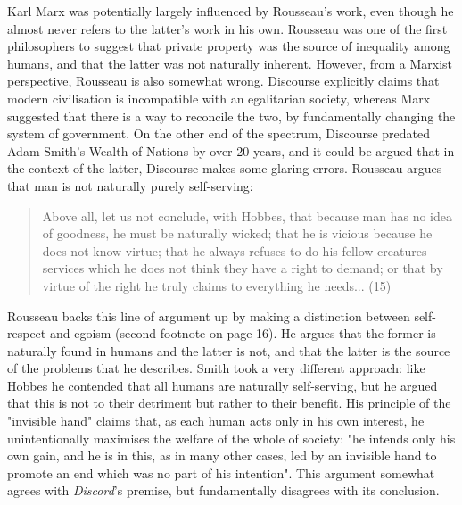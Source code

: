 Karl Marx was potentially largely influenced by Rousseau's work, even though he almost never refers to the latter's work in his own. Rousseau was one of the first philosophers to suggest that private property was the source of inequality among humans, and that the latter was not naturally inherent. However, from a Marxist perspective, Rousseau is also somewhat wrong. Discourse explicitly claims that modern civilisation is incompatible with an egalitarian society, whereas Marx suggested that there is a way to reconcile the two, by fundamentally changing the system of government. On the other end of the spectrum, Discourse predated Adam Smith's Wealth of Nations by over 20 years, and it could be argued that in the context of the latter, Discourse makes some glaring errors. Rousseau argues that man is not naturally purely self-serving:

\begin{quote}
  Above all, let us not conclude, with Hobbes, that because man has no idea of goodness, he must be naturally wicked; that he is vicious because he does not know virtue; that he always refuses to do his fellow-creatures services which he does not think they have a right to demand; or that by virtue of the right he truly claims to everything he needs... (15)
\end{quote}

Rousseau backs this line of argument up by making a distinction between self-respect and egoism (second footnote on page 16). He argues that the former is naturally found in humans and the latter is not, and that the latter is the source of the problems that he describes. Smith took a very different approach: like Hobbes he contended that all humans are naturally self-serving, but he argued that this is not to their detriment but rather to their benefit. His principle of the "invisible hand" claims that, as each human acts only in his own interest, he unintentionally maximises the welfare of the whole of society: "he intends only his own gain, and he is in this, as in many other cases, led by an invisible hand to promote an end which was no part of his intention". This argument somewhat agrees with \textit{Discord}'s premise, but fundamentally disagrees with its conclusion.


